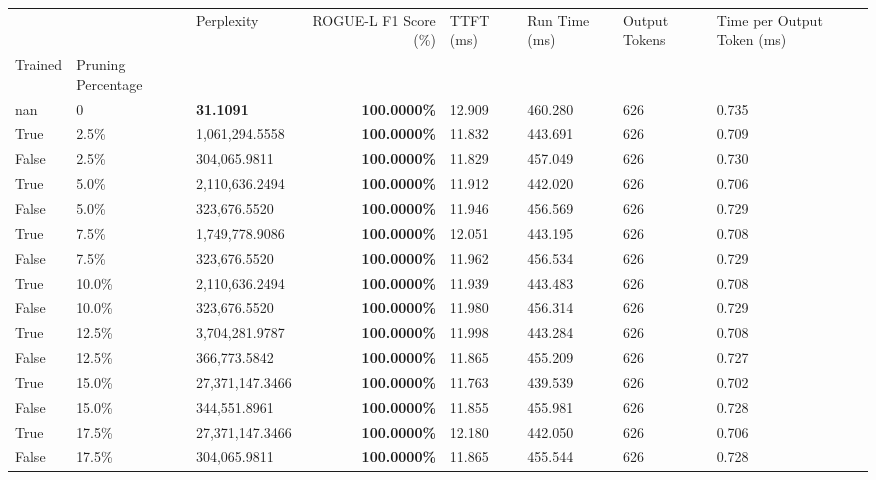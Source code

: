 \begin{table}[H]
\label{tab:evaluation-pipeline-5}
\begin{tabular}{lllrllll}
\toprule
 &  & Perplexity & ROGUE-L F1 Score (\%) & TTFT (ms) & Run Time (ms) & Output Tokens & Time per Output Token (ms) \\
Trained & Pruning Percentage &  &  &  &  &  &  \\
\midrule
nan & 0 & \bfseries 31.1091 & \bfseries 100.0000\% & 12.909 & 460.280 & 626 & 0.735 \\
\cline{1-8}
True & 2.5\% & 1,061,294.5558 & \bfseries \color{red} 100.0000\% & 11.832 & 443.691 & 626 & 0.709 \\
\cline{1-8}
False & 2.5\% & \color{red} 304,065.9811 & \bfseries \color{red} 100.0000\% & 11.829 & 457.049 & 626 & 0.730 \\
\cline{1-8}
True & 5.0\% & 2,110,636.2494 & \bfseries \color{red} 100.0000\% & 11.912 & 442.020 & 626 & 0.706 \\
\cline{1-8}
False & 5.0\% & 323,676.5520 & \bfseries \color{red} 100.0000\% & 11.946 & 456.569 & 626 & 0.729 \\
\cline{1-8}
True & 7.5\% & 1,749,778.9086 & \bfseries \color{red} 100.0000\% & 12.051 & 443.195 & 626 & 0.708 \\
\cline{1-8}
False & 7.5\% & 323,676.5520 & \bfseries \color{red} 100.0000\% & 11.962 & 456.534 & 626 & 0.729 \\
\cline{1-8}
True & 10.0\% & 2,110,636.2494 & \bfseries \color{red} 100.0000\% & 11.939 & 443.483 & 626 & 0.708 \\
\cline{1-8}
False & 10.0\% & 323,676.5520 & \bfseries \color{red} 100.0000\% & 11.980 & 456.314 & 626 & 0.729 \\
\cline{1-8}
True & 12.5\% & 3,704,281.9787 & \bfseries \color{red} 100.0000\% & 11.998 & 443.284 & 626 & 0.708 \\
\cline{1-8}
False & 12.5\% & 366,773.5842 & \bfseries \color{red} 100.0000\% & 11.865 & 455.209 & 626 & 0.727 \\
\cline{1-8}
True & 15.0\% & 27,371,147.3466 & \bfseries \color{red} 100.0000\% & 11.763 & 439.539 & 626 & 0.702 \\
\cline{1-8}
False & 15.0\% & 344,551.8961 & \bfseries \color{red} 100.0000\% & 11.855 & 455.981 & 626 & 0.728 \\
\cline{1-8}
True & 17.5\% & 27,371,147.3466 & \bfseries \color{red} 100.0000\% & 12.180 & 442.050 & 626 & 0.706 \\
\cline{1-8}
False & 17.5\% & \color{red} 304,065.9811 & \bfseries \color{red} 100.0000\% & 11.865 & 455.544 & 626 & 0.728 \\

\end{tabular}
\end{table}
